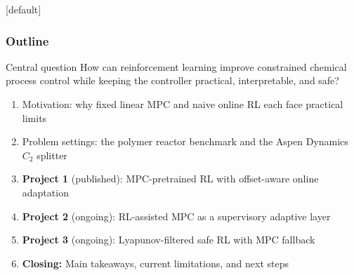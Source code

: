\documentclass[aspectratio=169]{beamer}
\begin{document}
\begin{frame}
[default]
\frametitle{\large \textbf{Outline}}
\small

\begin{block}{Central question}
\justifying
How can reinforcement learning improve constrained chemical process control while keeping the controller practical, interpretable, and safe?
\end{block}

\vspace{0.08cm}

\begin{enumerate}\justifying
  \setlength\itemsep{0.35ex}

  \item Motivation: why fixed linear MPC and naive online RL each face practical limits

  \item Problem settings: the polymer reactor benchmark and the Aspen Dynamics \(C_2\) splitter

  \item \textbf{Project 1} \textcolor{maccblue}{(published)}: MPC-pretrained RL with offset-aware online adaptation

  \item \textbf{Project 2} \textcolor{maccgreen}{(ongoing)}: RL-assisted MPC as a supervisory adaptive layer

  \item \textbf{Project 3} \textcolor{maccred}{(ongoing)}: Lyapunov-filtered safe RL with MPC fallback

  \item \textbf{Closing:} Main takeaways, current limitations, and next steps

\end{enumerate}

\end{frame}
\end{document}
